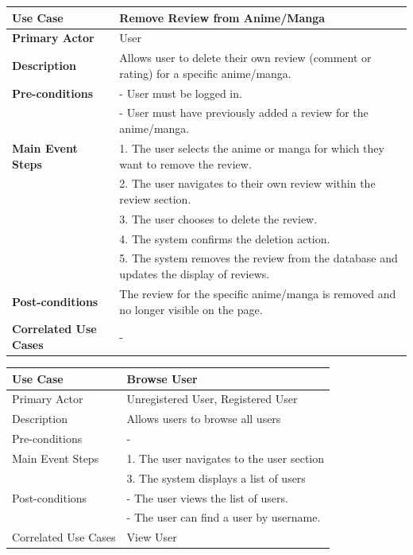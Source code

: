 \newpage

\begin{longtable}{|p{}|p{}|}
    \hline
    \rowcolor{lightblue}
    \textbf{Use Case} & \textbf{Remove Review from Anime/Manga} \\
    \hline
    \textbf{Primary Actor} & User \\
    \hline
    \textbf{Description} & Allows user to delete their own review (comment or rating) for a specific anime/manga. \\
    \hline
    \textbf{Pre-conditions} & - User must be logged in. \\
    & - User must have previously added a review for the anime/manga. \\
    \hline
    \textbf{Main Event Steps} & 1. The user selects the anime or manga for which they want to remove the review. \\
    & 2. The user navigates to their own review within the review section. \\
    & 3. The user chooses to delete the review. \\
    & 4. The system confirms the deletion action. \\
    & 5. The system removes the review from the database and updates the display of reviews. \\
    \hline
    \textbf{Post-conditions} & The review for the specific anime/manga is removed and no longer visible on the page. \\
    \hline
    \textbf{Correlated Use Cases} & -\\
    \hline
\end{longtable}

\begin{longtable}{|p{}|p{}|}
    \hline
    \rowcolor{lightblue}
    \textbf{Use Case} & \textbf{Browse User} \\
    \hline
    Primary Actor &Unregistered User, Registered User \\
    \hline
    Description &Allows users to browse all users\\
    \hline
    Pre-conditions & -\\
    \hline
    Main Event Steps &1. The user navigates to the user section\\
    &3. The system displays a list of users\\
    \hline
    Post-conditions & - The user views the list of users.\\
    & - The user can find a user by username.\\
    \hline
    Correlated Use Cases & View User\\
    \hline
\end{longtable}

